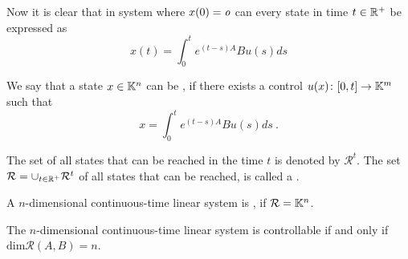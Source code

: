 Now it is clear that in system where $x(0)=\textit{o}$ can every state in time $t\in \mathbb{R}^+$ be expressed as $$x(t)=\int^t_0 e^{(t-s)A}Bu(s)ds$$

\begin{definition}
	We say that a state $x\in\mathbb{K}^n$ can be , if there exists a control $u(x)\colon[0,t]\rightarrow\mathbb{K}^m$ such that
	$$x=\int^t_0 e^{(t-s)A}Bu(s)ds\ .$$

	The set of all states that can be reached in the time $t$ is denoted by $\mathcal{R}^t$. The set $\mathcal{R}=\cup_{t\in\mathbb{R}^+}\mathcal{R}^t$ of all states that can be reached, is called a .
\end{definition}

\begin{definition}
	A $n$-dimensional continuous-time linear system is , if $\mathcal{R}=\mathbb{K}^n$.
\end{definition}

\begin{theorem}
	The $n$-dimensional continuous-time linear system is controllable if and only if $\text{dim}\mathcal{R}(A,B)=n$.
\end{theorem}

